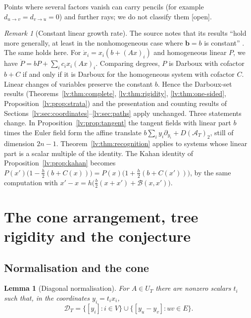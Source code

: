 \documentclass[11pt,a4paper]{article}
\newtheorem{lemma}[theorem]{Lemma}
\theoremstyle{definition}
\theoremstyle{remark}
\newtheorem{remark}[theorem]{Remark}
\newcommand{\lab}[1]{\textsf{[#1]}}
\begin{document}
Points where several factors vanish can carry pencils (for example $d_{u\to v}=d_{v\to u}=0$) and further rays; we do not classify them \lab{open}.

\begin{remark}[Constant linear growth rate]
\label{lv:rem:constant-b}
The source notes that its results ``hold more generally, at least in the nonhomogeneous case where $\mathbf b=b$ is constant'' \cite[\S3, before Example~8]{lv:K2025}. The same holds here. For $\dot x_i=x_i(b+(Ax)_i)$ and homogeneous linear $P$, we have $\dot P=bP+\sum_i c_ix_i(Ax)_i$. Comparing degrees, $P$ is Darboux with cofactor $b+C$ if and only if it is Darboux for the homogeneous system with cofactor $C$. Linear changes of variables preserve the constant $b$. Hence the Darboux-set results (Theorems~\ref{lv:thm:complete}, \ref{lv:thm:rigidity}, \ref{lv:thm:one-sided}, Proposition~\ref{lv:prop:strata}) and the presentation and counting results of Sections~\ref{lv:sec:coordinates}--\ref{lv:sec:paths} apply unchanged. Three statements change. In Proposition~\ref{lv:prop:tangent} the tangent fields with linear part $b$ times the Euler field form the affine translate $b\sum_iy_i\partial_{y_i}+D(\mathcal A_T)_2$, still of dimension $2n-1$. Theorem~\ref{lv:thm:recognition} applies to systems whose linear part is a scalar multiple of the identity. The Kahan identity of Proposition~\ref{lv:prop:kahan} becomes $P(x')\bigl(1-\tfrac h2(b+C(x))\bigr)=P(x)\bigl(1+\tfrac h2(b+C(x'))\bigr)$, by the same computation with $x'-x=h\bigl(\tfrac b2(x+x')+\mathcal B(x,x')\bigr)$.
\end{remark}

\section{The cone arrangement, tree rigidity and the conjecture}
\label{lv:sec:cone}

\subsection{Normalisation and the cone}

\begin{lemma}[Diagonal normalisation]
\label{lv:lem:normalisation}
For $A\in U_T$ there are nonzero scalars $t_i$ such that, in the coordinates $y_i=t_ix_i$,
\begin{equation}
 \mathcal D_T=
 \{[y_i]:i\in V\}
 \cup
 \{[y_u-y_v]:uv\in E\}.
 \label{lv:eq:normalised}
\end{equation}
\end{lemma}
\end{document}
